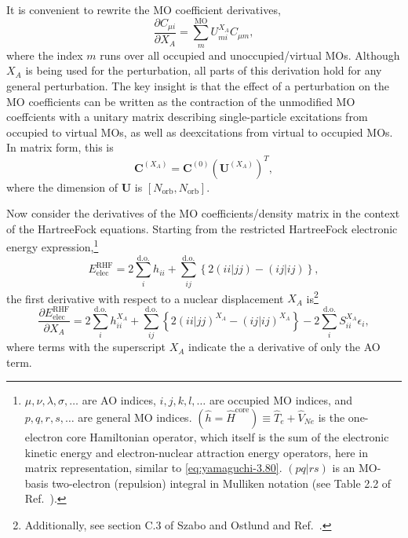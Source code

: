 \documentclass[%
class = book,%
crop = false,%
float = true,%
multi = true,%
preview = false,%
]{standalone}
\let\cite\autocite
\newcommand\hf{Hartree\textendash{}Fock}
\begin{document}
It is convenient to rewrite the MO coefficient derivatives,
\begin{equation}
  \tag{Yamaguchi eq. 3.7}
  \frac{\partial C_{\mu i}}{\partial X_{A}} = \sum_{m}^{\text{MO}} U_{mi}^{X_{A}} C_{\mu m},
\end{equation}
where the index \(m\) runs over all occupied and unoccupied/virtual MOs. Although \(X_{A}\) is being used for the perturbation, all parts of this derivation hold for any general perturbation. The key insight is that the effect of a perturbation on the MO coefficients can be written as the contraction of the unmodified MO coeffcients with a unitary matrix describing single-particle excitations from occupied to virtual MOs, as well as deexcitations from virtual to occupied MOs. In matrix form, this is
\begin{equation}
  \mathbf{C}^{(X_{A})} = \mathbf{C}^{(0)} \left( \mathbf{U}^{(X_{A})} \right)^{T},
\end{equation}
where the dimension of \(\mathbf{U}\) is \([N_{\text{orb}}, N_{\text{orb}}]\).

Now consider the derivatives of the MO coefficients/density matrix in the context of the \hf{} equations. Starting from the restricted \hf{} electronic energy expression,\footnote{\label{foot:hf-basics}\(\mu,\nu,\lambda,\sigma,\dots\) are AO indices, \(i,j,k,l,\dots\) are occupied MO indices, and \(p,q,r,s,\dots\) are general MO indices. \(\left(\hat{h} = \hat{H}^{\text{core}} \right) \equiv \hat{T}_{e} + \hat{V}_{Ne}\) is the one-electron core Hamiltonian operator, which itself is the sum of the electronic kinetic energy and electron-nuclear attraction energy operators, here in matrix representation, similar to \eqref{eq:yamaguchi-3.80}. \((pq|rs)\) is an MO-basis two-electron (repulsion) integral in Mulliken notation (see Table 2.2 of Ref.~\parencite{szabo1989modern}).}
\begin{equation}
  \label{eq:yamaguchi-4.1}\tag{Yamaguchi eq. 4.1}
  E_{\text{elec}}^{\text{RHF}} = 2 \sum_{i}^{\text{d.o.}} h_{ii} + \sum_{ij}^{\text{d.o.}} \left\{ 2(ii|jj) - (ij|ij) \right\},
\end{equation}
the first derivative with respect to a nuclear displacement \(X_{A}\) is\footnote{Additionally, see section C.3 of Szabo and Ostlund\cite{szabo1989modern} and Ref.~\parencite{Pople1979}.}
\begin{equation}
  \label{eq:yamaguchi-4.21}\tag{Yamaguchi eq. 4.21}
  \frac{\partial E_{\text{elec}}^{\text{RHF}}}{\partial X_{A}} = 2 \sum_{i}^{\text{d.o.}} h_{ii}^{X_{A}} + \sum_{ij}^{\text{d.o.}} \left\{ 2(ii|jj)^{X_{A}} - (ij|ij)^{X_{A}} \right\} - 2 \sum_{i}^{\text{d.o.}} S_{ii}^{X_{A}} \epsilon_{i},
\end{equation}
where terms with the superscript \(X_{A}\) indicate the a derivative of only the AO term.
\end{document}

